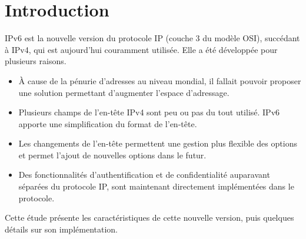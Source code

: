 \section{Introduction}

IPv6 est la nouvelle version du protocole IP (couche 3 du modèle OSI), succédant à IPv4, qui est aujourd'hui couramment utilisée.
Elle a été développée pour plusieurs raisons.
\begin{itemize}
  \item À cause de la pénurie d’adresses au niveau mondial, il fallait pouvoir proposer une solution permettant d'augmenter l'espace d'adressage.
  \item Plusieurs champs de l'en-tête IPv4 sont peu ou pas du tout utilisé. IPv6 apporte une simplification du format de l'en-tête.
  \item Les changements de l'en-tête permettent une gestion plus flexible des options et permet l'ajout de nouvelles options dans le futur.
  \item Des fonctionnalités d'authentification et de confidentialité auparavant séparées du protocole IP, sont maintenant directement implémentées dans le protocole.
\end{itemize}
  
Cette étude présente les caractéristiques de cette nouvelle version, puis quelques détails sur son implémentation.
  
